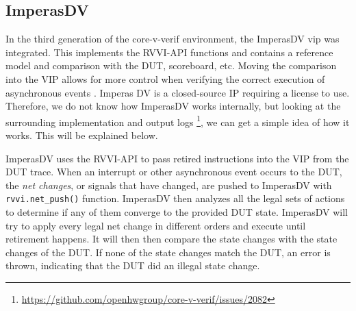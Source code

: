 %    


\subsection{ImperasDV}
\label{sec:imperasdv}

In the third generation of the core-v-verif environment, the ImperasDV \acrfull{vip} was integrated. This implements the RVVI-API functions and contains a reference model and comparison with the DUT, scoreboard, etc. Moving the comparison into the VIP allows for more control when verifying the correct execution of asynchronous events \cite{taylorAdvancedRISCVVerification2023}. Imperas DV is a closed-source IP requiring a license to use. Therefore, we do not know how ImperasDV works internally, but looking at the surrounding implementation \cite{openhwgroupOpenhwgroupCorevverif2023} and output logs \footnote{\url{https://github.com/openhwgroup/core-v-verif/issues/2082}}, we can get a simple idea of how it works. This will be explained below.

ImperasDV uses the RVVI-API to pass retired instructions into the VIP from the DUT trace. When an interrupt or other asynchronous event occurs to the DUT, the \textit{net changes}, or signals that have changed, are pushed to ImperasDV with \lstinline{rvvi.net_push()} function. ImperasDV then analyzes all the legal sets of actions to determine if any of them converge to the provided DUT state. ImperasDV will try to apply every legal net change in different orders and execute until retirement happens. It will then then compare the state changes with the state changes of the DUT. If none of the state changes match the DUT, an error is thrown, indicating that the DUT did an illegal state change.


